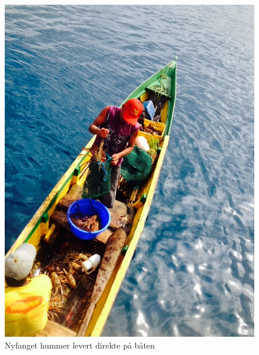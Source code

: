 \begin{figure}[H]
	\centering
	\includegraphics[width=\textwidth]{kjophummer}
	\caption*{Nyfanget hummer levert direkte på båten}
	\label{fig:hummer}
\end{figure}

